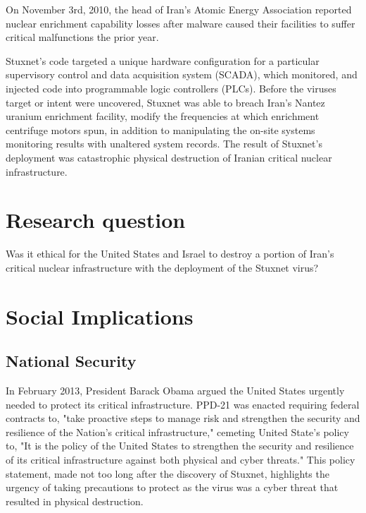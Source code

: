 \documentclass[12pt]{article}
\begin{document}
\begin{multicols}{2}
On November 3rd, 2010, the head of Iran's Atomic Energy Association reported nuclear enrichment capability losses after malware caused their facilities to suffer critical malfunctions the prior year.\cite{didStuxnetTakeOut1000Centrifuges} 

Stuxnet's code targeted a unique hardware configuration for a particular supervisory control and data acquisition system (SCADA), which monitored, and injected code into programmable logic controllers (PLCs). Before the viruses target or intent were uncovered, Stuxnet was able to breach Iran's Nantez uranium enrichment facility, modify the frequencies at which enrichment centrifuge motors spun, in addition to manipulating the on-site systems monitoring results with unaltered system records. The result of Stuxnet's deployment was catastrophic physical destruction of Iranian critical nuclear infrastructure.\cite{w32.stuxnetDossier}\cite{lessonsFromStuxnet}


\section{Research question}

Was it ethical for the United States and Israel to destroy a portion of Iran's critical nuclear infrastructure with the deployment of the Stuxnet virus?


\section{Social Implications}

\subsection{National Security}

In February 2013, President Barack Obama argued the United States urgently needed to protect its critical infrastructure. PPD-21 was enacted requiring federal contracts to, "take proactive steps to manage risk and strengthen the security and resilience of the Nation’s critical infrastructure," cemeting United State's policy to, "It is the policy of the United States to strengthen the security and resilience of its critical infrastructure against both physical and cyber threats."\cite{industrialCyberVulnerabilities} This policy statement, made not too long after the discovery of Stuxnet, highlights the urgency of taking precautions to protect as the virus was a cyber threat that resulted in physical destruction.


\end{multicols}
\end{document}
